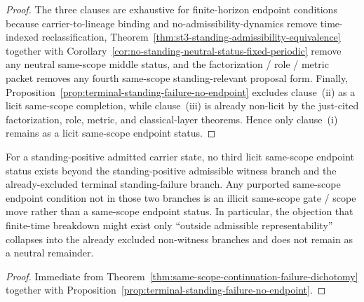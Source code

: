 \begin{proof}
The three clauses are exhaustive for finite-horizon endpoint conditions because carrier-to-lineage binding and no-admissibility-dynamics remove time-indexed reclassification, Theorem~\ref{thm:st3-standing-admissibility-equivalence} together with Corollary~\ref{cor:no-standing-neutral-status-fixed-periodic} remove any neutral same-scope middle status, and the factorization / role / metric packet removes any fourth same-scope standing-relevant proposal form. Finally, Proposition~\ref{prop:terminal-standing-failure-no-endpoint} excludes clause~(ii) as a licit same-scope completion, while clause~(iii) is already non-licit by the just-cited factorization, role, metric, and classical-layer theorems. Hence only clause~(i) remains as a licit same-scope endpoint status.
\end{proof}

\begin{manualcorollary}
\label{cor:no-third-same-scope-endpoint-status}\label{cor:outside-admissible-collapse-standing-failure}
For a standing-positive admitted carrier state, no third licit same-scope endpoint status exists beyond the standing-positive admissible witness branch and the already-excluded terminal standing-failure branch. Any purported same-scope endpoint condition not in those two branches is an illicit same-scope gate / scope move rather than a same-scope endpoint status. In particular, the objection that finite-time breakdown might exist only ``outside admissible representability'' collapses into the already excluded non-witness branches and does not remain as a neutral remainder.
\end{manualcorollary}

\begin{proof}
Immediate from Theorem~\ref{thm:same-scope-continuation-failure-dichotomy} together with Proposition~\ref{prop:terminal-standing-failure-no-endpoint}.
\end{proof}


